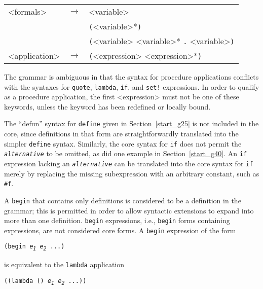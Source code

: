 {\begin{tabular}[H]{lcl}
\textless{}formals\textgreater{} & \(\longrightarrow\) & \textless{}variable\textgreater{}  \\

        & \textbar{} & \texttt{(}\textless{}variable\textgreater{}*\texttt{)}  \\

        & \textbar{} & \texttt{(}\textless{}variable\textgreater{} \textless{}variable\textgreater{}* \texttt{.} \textless{}variable\textgreater{}\texttt{)}  \\

\textless{}application\textgreater{} & \(\longrightarrow\) & \texttt{(}\textless{}expression\textgreater{} \textless{}expression\textgreater{}*\texttt{)}
 \\
\end{tabular}
}


The grammar is ambiguous in that the syntax for procedure applications
conflicts with the syntaxes for \texttt{quote}, \texttt{lambda},
\texttt{if}, and \texttt{set!} expressions.
In order to qualify as a procedure application, the first \textless{}expression\textgreater{} must
not be one of these keywords, unless the keyword has been redefined
or locally bound.


The \label{further_s9}``defun'' syntax for \texttt{define} given in
Section \ref{start_g25}
is not included in the core, since definitions in that form are
straightforwardly translated into the simpler \texttt{define} syntax.
Similarly, the core syntax for \texttt{if} does not permit the
\texttt{\textit{alternative}} to be omitted, as did one example in
Section \ref{start_g40}.
An \texttt{if} expression lacking an \texttt{\textit{alternative}} can be translated
into the core syntax for \texttt{if} merely by replacing the missing
subexpression with an arbitrary constant, such as \texttt{\#{}f}.


A \label{further_s10}\texttt{begin} that contains only definitions
is considered to be a
definition in the grammar; this is permitted in order to allow
syntactic extensions to expand into more than one definition.
\texttt{begin} expressions, i.e., \texttt{begin} forms containing expressions,
are not considered core forms.
A \texttt{begin} expression of the form


\texttt{(begin \textit{e\textsubscript{1}} \textit{e\textsubscript{2}} ...)}

is equivalent to the \texttt{lambda} application


\texttt{((lambda () \textit{e\textsubscript{1}} \textit{e\textsubscript{2}} ...))}

